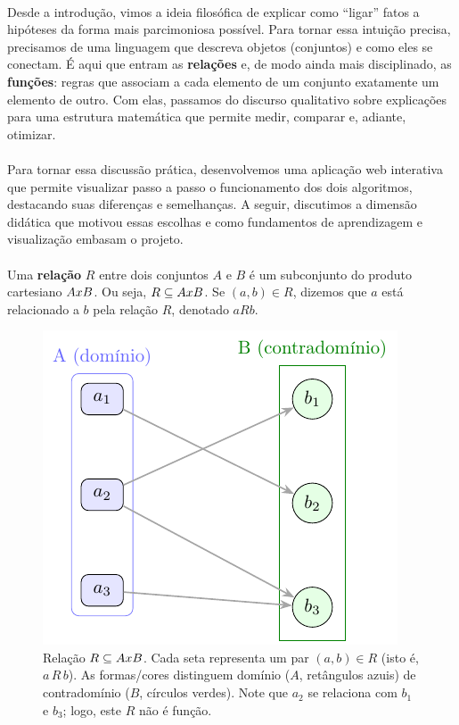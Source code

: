 \documentclass[12pt,a4paper]{article}
\def\emph#1{#1}%
\def\times{\string x}%
\begin{document}
\paragraph{}
Desde a introdução, vimos a ideia filosófica de explicar como “ligar” fatos a hipóteses da forma mais parcimoniosa possível. Para tornar essa intuição precisa, precisamos de uma linguagem que descreva objetos (conjuntos) e como eles se conectam. É aqui que entram as \textbf{relações} e, de modo ainda mais disciplinado, as \textbf{funções}: regras que associam a cada elemento de um conjunto exatamente um elemento de outro. Com elas, passamos do discurso qualitativo sobre explicações para uma estrutura matemática que permite medir, comparar e, adiante, otimizar.

\paragraph{}
Para tornar essa discussão prática, desenvolvemos uma aplicação web interativa que permite visualizar passo a passo o funcionamento dos dois algoritmos, destacando suas diferenças e semelhanças. A seguir, discutimos a dimensão didática que motivou essas escolhas e como fundamentos de aprendizagem e visualização embasam o projeto.

\paragraph{}
Uma \textbf{relação} \(R\) entre dois conjuntos \(A\) e \(B\) é um subconjunto do produto cartesiano \(A \times B\). Ou seja, \(R \subseteq A \times B\). Se \((a,b) \in R\), dizemos que \(a\) está relacionado a \(b\) pela relação \(R\), denotado \(aRb\).


\begin{figure}[H]
    \centering
    \includegraphics[width=0.9\linewidth]{figures/fig_relacao.pdf}

    \caption{Relação $R\subseteq A\times B$. Cada seta representa um par $(a,b)\in R$ (isto é, $a\,R\,b$). As formas/cores distinguem domínio ($A$, retângulos azuis) de contradomínio ($B$, círculos verdes). Note que $a_2$ se relaciona com $b_1$ e $b_3$; logo, este $R$ \emph{não é função}.}
    \label{fig:relacao}
    \end{figure}
\end{document}
